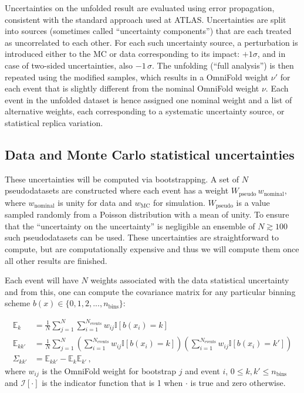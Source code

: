 Uncertainties on the unfolded result are evaluated using error propagation, consistent with the standard approach used at ATLAS.
Uncertainties are split into sources (sometimes called ``uncertainty components'') that are each treated as uncorrelated to each other.
For each such uncertainty source, a perturbation is introduced either to the MC or data corresponding to its impact: $+1\sigma$, and in case of two-sided uncertainties, also $-1\,\sigma$. The unfolding (``full analysis'') is then repeated using the modified samples, which results in a OmniFold weight $\nu'$ for each event that is slightly different from the nominal OmniFold weight $\nu$. Each event in the unfolded dataset is hence assigned one nominal weight and a list of alternative weights, each corresponding to a systematic uncertainty source, or statistical replica variation.

\subsection{Data and Monte Carlo statistical uncertainties}
These uncertainties will be computed via bootstrapping.  A set of $N$ pseudodatasets are constructed where each event has a weight $W_\text{pseudo}\,w_\text{nominal}$, where $w_\text{nominal}$ is unity for data and $w_\text{MC}$ for simulation. $W_\text{pseudo}$ is a value sampled randomly from a Poisson distribution with a mean of unity.  To ensure that the ``uncertainty on the uncertainty'' is negligible an ensemble of $N\gtrsim 100$ such pseudodatasets can be used.  These uncertainties are straightforward to compute, but are computationally expensive and thus we will compute them once all other results are finished.

Each event will have $N$ weights associated with the data statistical uncertainty and from this, one can compute the covariance matrix for any particular binning scheme $b(x)\in\{0,1,2,...,n_\text{bins}\}$:

\begin{align}
\mathbb{E}_k &= \frac{1}{N}\sum_{j=1}^N\sum_{i=1}^{N_\text{events}} w_{ij} \mathbb{I}[b(x_i)=k]\\
\mathbb{E}_{kk'} &= \frac{1}{N}\sum_{j=1}^N \left(\sum_{i=1}^{N_\text{events}} w_{ij} \mathbb{I}[b(x_i)=k]\right)\left(\sum_{i=1}^{N_\text{events}} w_{ij} \mathbb{I}[b(x_i)=k']\right)\\
\Sigma_{kk'}&=\mathbb{E}_{kk'} - \mathbb{E}_k\mathbb{E}_{k'}\,,
\end{align}
%
where $w_{ij}$ is the OmniFold weight for bootstrap $j$ and event $i$, $0\leq k,k'\leq n_\text{bins}$ and $\mathcal{I}[\cdot]$ is the indicator function that is 1 when $\cdot$ is true and zero otherwise.

